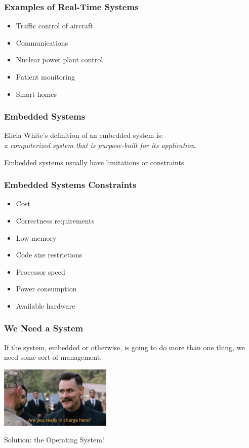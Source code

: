 \begin{frame}
\frametitle{Examples of Real-Time Systems}

\begin{itemize}
	\item Traffic control of aircraft
	\item Communications
	\item Nuclear power plant control
	\item Patient monitoring
	\item Smart homes
\end{itemize}

\end{frame}

\begin{frame}
\frametitle{Embedded Systems}

Elicia White's definition of an embedded system is:\\
\quad \textit{a computerized system that is purpose-built for its application.}

Embedded systems usually have limitations or constraints.

\end{frame}

\begin{frame}
\frametitle{Embedded Systems Constraints}
\begin{itemize}
	\item Cost
	\item Correctness requirements
	\item Low memory
	\item Code size restrictions
	\item Processor speed
	\item Power consumption
	\item Available hardware
\end{itemize}
\end{frame}

\begin{frame}
\frametitle{We Need a System}

If the system, embedded or otherwise, is going to do more than one thing, we need some sort of management.

\begin{center}
  \includegraphics[width=0.4\textwidth]{images/incharge.png}
\end{center}

Solution: the Operating System!

\end{frame}

